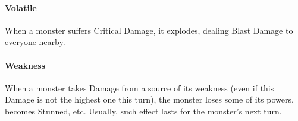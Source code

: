 \documentclass[itdr]{subfiles}
\begin{document}
\vfill
\paragraph{Volatile}
When a monster suffers Critical Damage, it explodes, dealing Blast Damage to everyone nearby.

\vfill
\paragraph{Weakness}
When a monster takes Damage from a source of its weakness (even if this Damage is not the highest one this turn), the monster loses some of its powers, becomes Stunned, etc. Usually, such effect lasts for the monster's next turn.

\vfill
\end{document}
